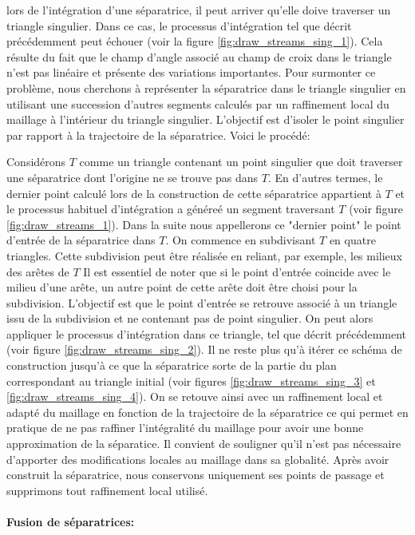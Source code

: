 lors de l'intégration d'une séparatrice, il peut arriver qu'elle doive traverser un triangle singulier. Dans ce cas, le processus d'intégration tel que décrit précédemment peut échouer (voir la figure \ref{fig:draw_streams_sing_1}). Cela résulte du fait que le champ d'angle associé au champ de croix dans le triangle n'est pas linéaire et présente des variations importantes. Pour surmonter ce problème, nous cherchons à représenter la séparatrice dans le triangle singulier en utilisant une succession d'autres segments calculés par un raffinement local du maillage à l'intérieur du triangle singulier. L'objectif est d'isoler le point singulier par rapport à la trajectoire de la séparatrice. Voici le procédé:

Considérons $T$ comme un triangle contenant un point singulier que doit traverser une séparatrice dont l'origine ne se trouve pas dans $T$. En d'autres termes, le dernier point calculé lors de la construction de cette séparatrice appartient à $T$ et le processus habituel d'intégration a généreé un segment traversant $T$ (voir figure \ref{fig:draw_streams_1}). Dans la suite nous appellerons ce "dernier point" le point d'entrée de la séparatrice dans $T$. On commence en subdivisant $T$ en quatre triangles. Cette subdivision peut être réalisée en reliant, par exemple, les milieux des arêtes de $T$ Il est essentiel de noter que si le point d'entrée coincide avec le milieu d'une arête, un autre point de cette arête doit être choisi pour la subdivision. L'objectif est que le point d'entrée se retrouve associé à un triangle issu de la subdivision et ne contenant pas de point singulier. On peut alors appliquer le processus d'intégration dans ce triangle, tel que décrit précédemment (voir figure \ref{fig:draw_streams_sing_2}). Il ne reste plus qu'à itérer ce schéma de construction jusqu'à ce que la séparatrice sorte de la partie du plan correspondant au triangle initial (voir figures \ref{fig:draw_streams_sing_3} et \ref{fig:draw_streams_sing_4}). On se retouve ainsi avec un raffinement local et adapté du maillage en fonction de la trajectoire de la séparatrice ce qui permet en pratique de ne pas raffiner l'intégralité du maillage pour avoir une bonne approximation de la séparatice. Il convient de souligner qu'il n'est pas nécessaire d'apporter des modifications locales au maillage dans sa globalité. Après avoir construit la séparatrice, nous conservons uniquement ses points de passage et supprimons tout raffinement local utilisé.


\paragraph{Fusion de séparatrices:} 


